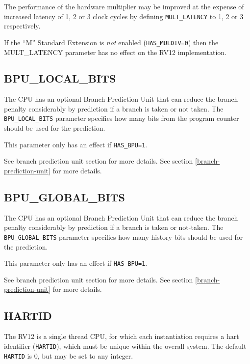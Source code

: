 The performance of the hardware multiplier may be improved at the
expense of increased latency of 1, 2 or 3 clock cycles by defining
\texttt{MULT\_LATENCY} to 1, 2 or 3 respectively.

If the ``M'' Standard Extension is \emph{not} enabled (\texttt{HAS\_MULDIV=0})
then the MULT\_LATENCY parameter has no effect on the RV12
implementation.

\subsection{BPU\_LOCAL\_BITS}\label{bpu_local_bits}

The CPU has an optional Branch Prediction Unit that can reduce the
branch penalty considerably by prediction if a branch is taken or not
taken. The \texttt{BPU\_LOCAL\_BITS} parameter specifies how many bits from the
program counter should be used for the prediction.

This parameter only has an effect if \texttt{HAS\_BPU=1}.

\ifdefined\MARKDOWN
See branch prediction unit section for more details.
\else
See section \ref{branch-prediction-unit}  for more details.
\fi

\subsection{BPU\_GLOBAL\_BITS}\label{bpu_global_bits}

The CPU has an optional Branch Prediction Unit that can reduce the
branch penalty considerably by prediction if a branch is taken or
not-taken. The \texttt{BPU\_GLOBAL\_BITS} parameter specifies how many history
bits should be used for the prediction.

This parameter only has an effect if \texttt{HAS\_BPU=1}.

\ifdefined\MARKDOWN
See branch prediction unit section for more details.
\else
See section \ref{branch-prediction-unit}  for more details.
\fi

\subsection{HARTID}\label{hartid}

The RV12 is a single thread CPU, for which each instantiation requires a
hart identifier (\texttt{HARTID}), which must be unique within the overall
system. The default \texttt{HARTID} is 0, but may be set to any integer.

